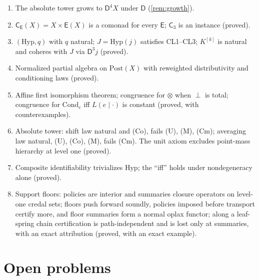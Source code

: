 \documentclass[11pt]{article}
\theoremstyle{definition}
\theoremstyle{remark}
\newcommand{\D}{\mathsf{D}}
\newcommand{\Hyp}{\mathrm{Hyp}}
\newcommand{\Post}{\mathrm{Post}}
\newcommand{\Cond}{\mathrm{Cond}}
\newcommand{\C}{\mathsf{C}}
\newcommand{\E}{\mathsf{E}}
\begin{document}
\begin{enumerate}[leftmargin=*]
  the sides exchanged, so no partial order can orient both (proved; exact checks).
\item The absolute tower grows to $\D^4X$ under $\D$ (\cref{rem:growth}).
\item $\C_\E(X)=X\times\E(X)$ is a comonad for every $\E$; $\C_3$ is an instance (proved).
\item $(\Hyp,q)$ with $q$ natural; $J=\Hyp(j)$ satisfies CL1--CL3; $K^{[k]}$ is natural and coheres
  with $J$ via $\D^3j$ (proved).
\item Normalized partial algebra on $\Post(X)$ with reweighted distributivity and conditioning laws
  (proved).
\item Affine first isomorphism theorem; congruence for $\otimes$ when $\perp$ is total; congruence for
  $\Cond_e$ iff $L(e\mid\cdot)$ is constant (proved, with counterexamples).
\item Absolute tower: shift law natural and (Co), fails (U), (M), (Cm); averaging law natural,
  (U), (Co), (M), fails (Cm). The unit axiom excludes point-mass hierarchy at level one (proved).
\item Composite identifiability trivializes $\Hyp$; the ``iff'' holds under nondegeneracy alone (proved).
\item Support floors: policies are interior and summaries closure operators on level-one credal sets; floors push forward soundly, policies imposed before transport certify more, and floor summaries form a normal oplax functor; along a leaf-spring chain certification is path-independent and is lost only at summaries, with an exact attribution (proved, with an exact example).
\end{enumerate}

\section{Open problems}
\end{document}
